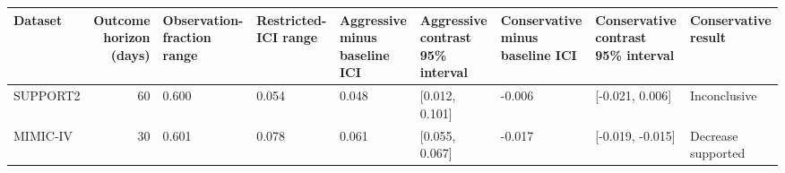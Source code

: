 \begin{tabular}{lrlllllll}
\toprule
Dataset & Outcome horizon (days) & Observation-fraction range & Restricted-ICI range & Aggressive minus baseline ICI & Aggressive contrast 95\% interval & Conservative minus baseline ICI & Conservative contrast 95\% interval & Conservative result \\
\midrule
SUPPORT2 & 60 & 0.600 & 0.054 & 0.048 & [0.012, 0.101] & -0.006 & [-0.021, 0.006] & Inconclusive \\
MIMIC-IV & 30 & 0.601 & 0.078 & 0.061 & [0.055, 0.067] & -0.017 & [-0.019, -0.015] & Decrease supported \\
\bottomrule
\end{tabular}
